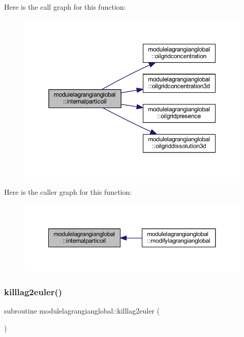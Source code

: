 Here is the call graph for this function\+:\nopagebreak
\begin{figure}[H]
\begin{center}
\leavevmode
\includegraphics[width=350pt]{namespacemodulelagrangianglobal_aaea914ea480f8d07a53b58420bf6b67e_cgraph}
\end{center}
\end{figure}
Here is the caller graph for this function\+:\nopagebreak
\begin{figure}[H]
\begin{center}
\leavevmode
\includegraphics[width=350pt]{namespacemodulelagrangianglobal_aaea914ea480f8d07a53b58420bf6b67e_icgraph}
\end{center}
\end{figure}
\mbox{\label{namespacemodulelagrangianglobal_aebe9f7760ed357205d3844024707e233}} 
\subsubsection{\texorpdfstring{killlag2euler()}{killlag2euler()}}
{\footnotesize\ttfamily subroutine modulelagrangianglobal\+::killlag2euler (\begin{DoxyParamCaption}{ }\end{DoxyParamCaption})\hspace{0.3cm}{\ttfamily [private]}}

